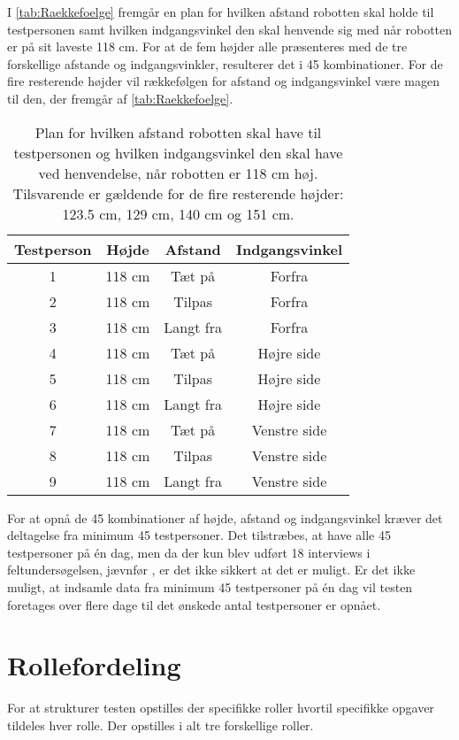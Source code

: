 I \autoref{tab:Raekkefoelge} fremgår en plan for hvilken afstand robotten skal holde til testpersonen samt hvilken indgangsvinkel den skal henvende sig med når robotten er på sit laveste 118 cm. For at de fem højder alle præsenteres med de tre forskellige afstande og indgangsvinkler, resulterer det i 45 kombinationer. For de fire resterende højder vil rækkefølgen for afstand og indgangsvinkel være magen til den, der fremgår af \autoref{tab:Raekkefoelge}.    
%
\begin{table}[H]
	\centering 
	\begin{tabular}{c|c|c|c}
		Testperson  & Højde & Afstand & Indgangsvinkel \\\hline
		1   & 118 cm & Tæt på & Forfra  \\\hline
		2   & 118 cm & Tilpas & Forfra \\ \hline
		3   & 118 cm & Langt fra  & Forfra \\ \hline
		4   & 118 cm & Tæt på & Højre side \\ \hline
		5   & 118 cm & Tilpas & Højre side \\ \hline
		6   & 118 cm & Langt fra & Højre side \\ \hline
		7   & 118 cm & Tæt på & Venstre side \\ \hline
		8   & 118 cm & Tilpas & Venstre side \\ \hline
		9   & 118 cm & Langt fra  & Venstre side 
	\end{tabular} 
	\caption{Plan for hvilken afstand robotten skal have til testpersonen og hvilken indgangsvinkel den skal have ved henvendelse, når robotten er 118 cm høj. Tilsvarende er gældende for de fire resterende højder: 123.5 cm, 129 cm, 140 cm og 151 cm.}
	\label{tab:Raekkefoelge}       
\end{table}
\noindent
%
For at opnå de 45 kombinationer af højde, afstand og indgangsvinkel kræver det deltagelse fra minimum 45 testpersoner. Det tilstræbes, at have alle 45 testpersoner på én dag, men da der kun blev udført 18 interviews i feltundersøgelsen, jævnfør , er det ikke sikkert at det er muligt. Er det ikke muligt, at indsamle data fra minimum 45 testpersoner på én dag vil testen foretages over flere dage til det ønskede antal testpersoner er opnået.   

\section{Rollefordeling}
\label{TestAfSkalaRollefordeling}
%
For at strukturer testen opstilles der specifikke roller hvortil specifikke opgaver tildeles hver rolle. Der opstilles i alt tre forskellige roller. 
%
